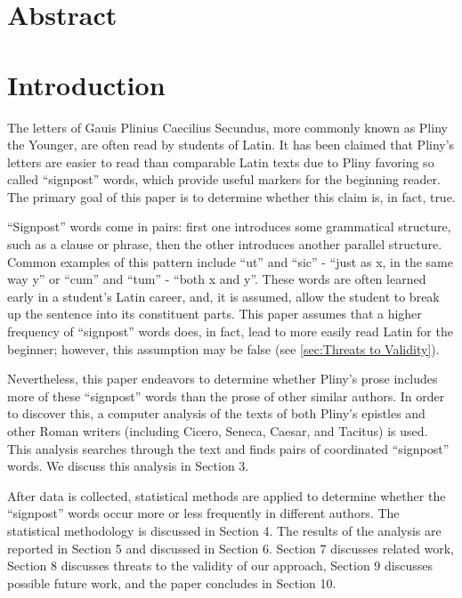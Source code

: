 \section{Abstract}
    

\section{Introduction}
\label{sec:Intro}

The letters of Gauis Plinius Caecilius Secundus, more commonly known as Pliny the Younger, are often read by students of Latin.  It has been claimed \cite{Woodmanpm} that Pliny's letters are easier to read than comparable Latin texts due to Pliny favoring so called ``signpost'' words, which provide useful markers for the beginning reader. The primary goal of this paper is to determine whether this claim is, in fact, true.

``Signpost'' words come in pairs: first one introduces some grammatical structure, such as a clause or phrase, then the other introduces another parallel structure. Common examples of this pattern include ``ut'' and ``sic'' - ``just as x, in the same way y'' or ``cum'' and ``tum'' - ``both x and y''. These words are often learned early in a student's Latin career, and, it is assumed, allow the student to break up the sentence into its constituent parts. This paper assumes that a higher frequency of ``signpost'' words does, in fact, lead to more easily read Latin for the beginner; however, this assumption may be false (see \ref{sec:Threats to Validity}).

Nevertheless, this paper endeavors to determine whether Pliny's prose includes more of these ``signpost'' words than the prose of other similar authors. In order to discover this, a computer analysis of the texts of both Pliny's epistles and other Roman writers (including Cicero, Seneca, Caesar, and Tacitus) is used. This analysis searches through the text and finds pairs of coordinated ``signpost'' words. We discuss this analysis in Section 3.
 
After data is collected, statistical methods are applied to determine whether the ``signpost'' words occur more or less frequently in different authors. The statistical methodology is discussed in Section 4. The results of the analysis are reported in Section 5 and discussed in Section 6. Section 7 discusses related work, Section 8 discusses threats to the validity of our approach, Section 9 discusses possible future work, and the paper concludes in Section 10.

